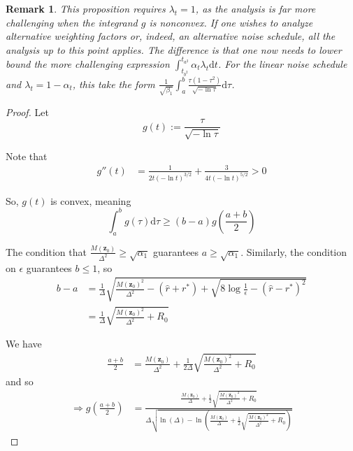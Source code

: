 \documentclass[11pt]{article}
\newcommand{\fitparenth}[1]{\left(#1\right)}
\newcommand{\vect}[1]{\mathbf{#1}}
\theoremstyle{plain}
\newtheorem{remark}{Remark}
\newcommand{\1}{\mathbbm{1}}
\newcommand{\separation}{\Delta}
\begin{document}
\begin{appendices}
\begin{remark}
    This proposition requires $\lambda_t=1$, as the analysis is far more challenging when the integrand $g$ is nonconvex. If one wishes to analyze alternative weighting factors or, indeed, an alternative noise schedule, all the analysis up to this point applies. The difference is that one now needs to lower bound the more challenging expression
    $\int_{t_{b^2}}^{t_{a^2}}\alpha_t\lambda_t\mathrm{d}t$. For the linear noise schedule and $\lambda_t=1-\alpha_t$, this take the form $\frac{1}{\sqrt{\beta_1}}\int_{a}^b \frac{\tau(1-\tau^2)}{\sqrt{-\ln \tau}}\mathrm{d}\tau$.
\end{remark}

\begin{proof}
    Let \[g(t):= \frac{\tau}{\sqrt{-\ln \tau}}\]

    Note that 
    \begin{align*}
        g''(t)&= \frac{1}{2t(-\ln t)^{3/2}} + \frac{3}{4t(-\ln t)^{5/2}} >0
    \end{align*}

    So, $g(t)$ is convex, meaning 
    \[\int_a^b g(\tau)\mathrm{d}\tau \geq (b-a)g\fitparenth{\frac{a+b}{2}}\]

    The condition that $\frac{M(\vect z_0)}{\separation^2}\geq \sqrt{\alpha_1}$ guarantees $a\geq\sqrt{\alpha_1}$. Similarly, the condition on $\epsilon$ guarantees $b\leq 1$, so
    \begin{align*}
        b-a&=\frac{1}{\separation}\sqrt{\frac{M(\vect z_0)^2}{\separation^2} - \fitparenth{ \hat r + r^*}+\sqrt{8\log \frac{1}{\epsilon}-\fitparenth{\hat r-r^*}^2}}
        \\
        &= \frac{1}{\separation}\sqrt{\frac{M(\vect z_0)^2}{\separation^2} + R_0}
    \end{align*}

    We have 
    \begin{align*}
        \frac{a+b}{2}&= \frac{M(\vect z_0)}{\separation^2}+\frac{1}{2\separation}\sqrt{\frac{M(\vect z_0)^2}{\separation^2} + R_0}
    \end{align*}
    and so
    \begin{align*}
        \Longrightarrow g\fitparenth{\frac{a+b}{2}}&= \frac{\frac{M(\vect z_0)}{\separation}+\frac{1}{2}\sqrt{\frac{M(\vect z_0)^2}{\separation^2} + R_0}}{\separation\sqrt{\ln(\separation)- \ln\fitparenth{\frac{M(\vect z_0)}{\separation}+ \frac{1}{2}\sqrt{\frac{M(\vect z_0)^2}{\separation^2} + R_0}}}}
    \end{align*}


\end{proof}
\end{appendices}
\end{document}
